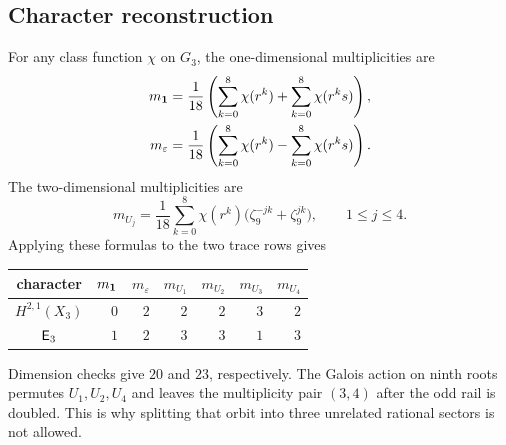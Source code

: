 \subsection{Character reconstruction}

For any class function \(\chi\) on \(G_3\), the one-dimensional
multiplicities are
\begin{align*}
m_{\mathbf 1}
&=\frac1{18}\left(\sum_{k=0}^{8}\chi(r^k)
 +\sum_{k=0}^{8}\chi(r^ks)\right),\\
m_{\varepsilon}
&=\frac1{18}\left(\sum_{k=0}^{8}\chi(r^k)
 -\sum_{k=0}^{8}\chi(r^ks)\right).
\end{align*}
The two-dimensional multiplicities are
\[
m_{U_j}=\frac1{18}\sum_{k=0}^{8}
\chi(r^k)\bigl(\zeta_9^{-jk}+\zeta_9^{jk}\bigr),
\qquad 1\le j\le4.
\]
Applying these formulas to the two trace rows gives
\begin{center}
\begin{tabular}{@{}c|rrrrrr@{}}
\toprule
character & \(m_{\mathbf 1}\) & \(m_{\varepsilon}\) & \(m_{U_1}\) &
\(m_{U_2}\) & \(m_{U_3}\) & \(m_{U_4}\)\\
\midrule
\(H^{2,1}(X_3)\) & \(0\) & \(2\) & \(2\) & \(2\) & \(3\) & \(2\)\\
\(\mathsf E_3\) & \(1\) & \(2\) & \(3\) & \(3\) & \(1\) & \(3\)\\
\bottomrule
\end{tabular}
\end{center}
Dimension checks give \(20\) and \(23\), respectively.  The Galois action
on ninth roots permutes \(U_1,U_2,U_4\) and leaves the multiplicity pair
\((3,4)\) after the odd rail is doubled.  This is why splitting that orbit
into three unrelated rational sectors is not allowed.
